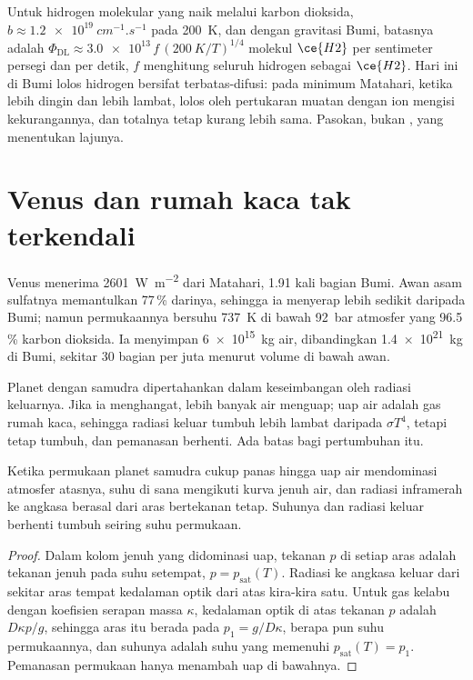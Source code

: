Untuk hidrogen molekular yang naik melalui karbon dioksida, $b \approx
\qty{1.2e19}{cm^{-1}.s^{-1}}$ pada \qty{200}{K}, dan dengan
gravitasi Bumi, batasnya adalah $\Phi_\mathrm{DL} \approx
\num{3.0e13}\,f\,(\qty{200}{K}/T)^{1/4}$ molekul $\ce{H2}$ per
sentimeter persegi dan per detik, $f$ menghitung seluruh hidrogen sebagai $\ce{H2}$. Hari ini di Bumi
lolos hidrogen bersifat terbatas-difusi: pada
minimum Matahari, ketika  lebih dingin dan  lebih lambat, lolos
oleh pertukaran muatan dengan ion mengisi kekurangannya, dan totalnya tetap kurang lebih
sama. Pasokan, bukan
, yang menentukan lajunya.

\section{Venus dan rumah kaca tak terkendali}\label{sec:b3:planetary-atmospheres:venus}

Venus menerima \qty{2601}{W.m^{-2}} dari Matahari, 1.91 kali
bagian Bumi. Awan asam sulfatnya memantulkan 77\,\% darinya, sehingga ia menyerap
lebih sedikit daripada Bumi; namun permukaannya bersuhu \qty{737}{K} di bawah \qty{92}{bar}
atmosfer yang 96.5\,\% karbon dioksida. Ia menyimpan \qty{6e15}{kg} air,
dibandingkan \qty{1.4e21}{kg} di Bumi, sekitar 30 bagian per juta menurut
volume di bawah awan.

Planet dengan samudra dipertahankan dalam keseimbangan oleh radiasi keluarnya. Jika
ia menghangat, lebih banyak air menguap; uap air adalah gas rumah kaca, sehingga
radiasi keluar tumbuh lebih lambat daripada $\sigma T^4$, tetapi tetap tumbuh, dan
pemanasan berhenti. Ada batas bagi pertumbuhan itu.

\begin{proposition}\label{prop:b3:planetary-atmospheres:limit}
Ketika permukaan planet samudra cukup panas hingga uap air
mendominasi atmosfer atasnya, suhu di sana mengikuti
kurva jenuh air, dan radiasi inframerah ke angkasa berasal dari
aras bertekanan tetap. Suhunya dan radiasi keluar
berhenti tumbuh seiring suhu permukaan.
\end{proposition}

\begin{proof}
Dalam kolom jenuh yang didominasi uap, tekanan $p$ di setiap
aras adalah tekanan jenuh pada suhu setempat, $p =
p_\mathrm{sat}(T)$. Radiasi ke angkasa keluar dari sekitar aras
tempat kedalaman optik dari atas kira-kira satu. Untuk gas kelabu dengan koefisien
serapan massa $\kappa$, kedalaman optik di atas tekanan $p$
adalah $D\kappa p/g$, sehingga aras itu berada pada $p_1 = g/D\kappa$, berapa pun
suhu permukaannya, dan suhunya adalah suhu yang memenuhi
$p_\mathrm{sat}(T) = p_1$. Pemanasan permukaan hanya menambah uap di bawahnya.
\end{proof}

